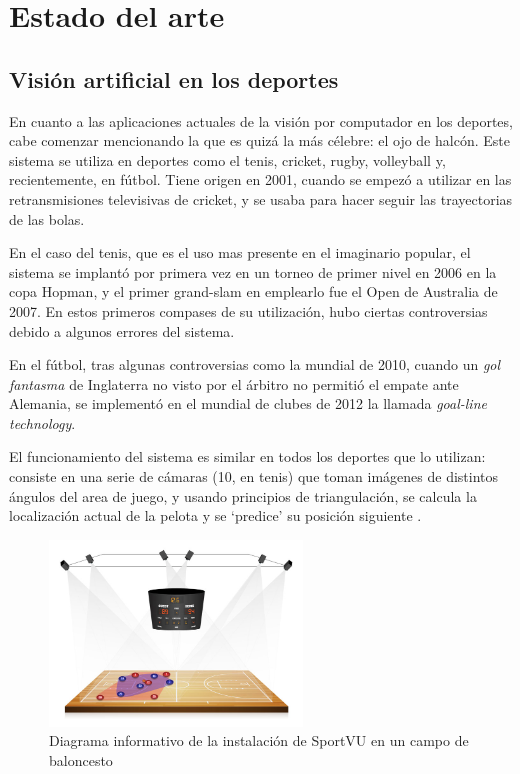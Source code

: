 \section{Estado del arte}


\subsection{Visión artificial en los deportes}
En cuanto a las aplicaciones actuales de la visión por computador en los deportes, cabe comenzar mencionando la que es quizá la más célebre: el ojo de halcón. Este sistema se utiliza en deportes como el tenis, cricket, rugby, volleyball y, recientemente, en fútbol. Tiene origen en 2001, cuando se empezó a utilizar en las retransmisiones televisivas de cricket, y se usaba para hacer seguir las trayectorias de las bolas.

En el caso del tenis, que es el uso mas presente en el imaginario popular, el sistema se implantó por primera vez en un torneo de primer nivel en 2006 en la copa Hopman, y el primer grand-slam en emplearlo fue el Open de Australia de 2007. En estos primeros compases de su utilización, hubo ciertas controversias debido a algunos errores del sistema.

En el fútbol, tras algunas controversias como la mundial de 2010, cuando un \textit{gol fantasma} de Inglaterra no visto por el árbitro no permitió el empate ante Alemania, se implementó en el mundial de clubes de 2012 la llamada \textit{goal-line technology}.

El funcionamiento del sistema es similar en todos los deportes que lo utilizan: consiste en una serie de cámaras (10, en tenis) que toman imágenes de distintos ángulos del area de juego, y usando principios de triangulación, se calcula la localización actual de la pelota y se `predice' su posición siguiente \cite{wiki:hawk}.

\begin{figure}
    \centering
    \includegraphics[width=0.6\textwidth]{images/sportVU}
    \caption{Diagrama informativo de la instalación de SportVU en un campo de baloncesto}
    \label{fig:sportVU}
\end{figure}

